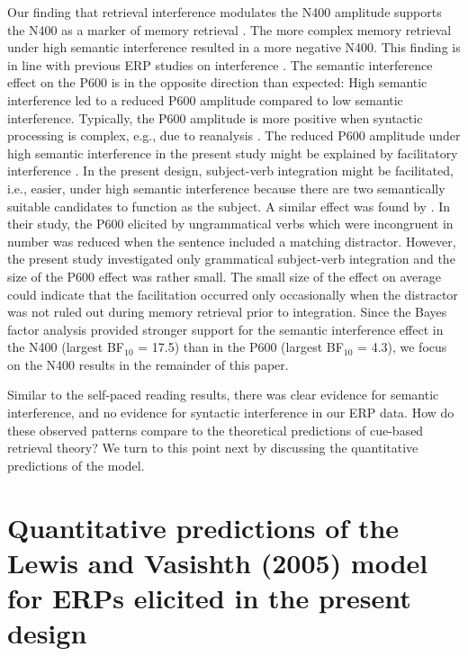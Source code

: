 \documentclass[review,preprint,12pt,authoryear,floatsintext]{elsarticle}
\begin{document}
Our finding that retrieval interference modulates the N400 amplitude supports the N400 as a marker of memory retrieval \citep{kutas&federmeier_2000, kutas_federmeier2011, brouwer2017_n4_p6, lau2008_n400}. The more complex memory retrieval under high semantic interference resulted in a more negative N400. This finding is in line with previous ERP studies on interference \citep{lee_garnsey, vasishth_drenhaus_2011, martinetal2014, schoknecht2022}. The semantic interference effect on the P600 is in the opposite direction than expected: High semantic interference led to a reduced P600 amplitude compared to low semantic interference. Typically, the P600 amplitude is more positive when syntactic processing is complex, e.g., due to reanalysis \citep{osterhout&holcomb_1992}. The reduced P600 amplitude under high semantic interference in the present study might be explained by facilitatory interference \citep[see e.g.,][]{jaeger_etal_2017}. In the present design, subject-verb integration might be facilitated, i.e., easier, under high semantic interference because there are two semantically suitable candidates to function as the subject. A similar effect was found by \cite{Tanner_etal_2017}. In their study, the P600 elicited by ungrammatical verbs which were incongruent in number was reduced when the sentence included a matching distractor. However, the present study investigated only grammatical subject-verb integration and the size of the P600 effect was rather small. The small size of the effect on average could indicate that the facilitation occurred only occasionally when the distractor was not ruled out during memory retrieval prior to integration. Since the Bayes factor analysis provided stronger support for the semantic interference effect in the N400 (largest BF$_{10}$ = 17.5) than in the P600 (largest BF$_{10}$ = 4.3), we focus on the N400 results in the remainder of this paper.

Similar to the self-paced reading results, there was clear evidence for semantic interference, and no evidence for syntactic interference in our ERP data. How do these observed patterns compare to the theoretical predictions of cue-based retrieval theory? We turn to this point next by discussing the quantitative predictions of the \cite{Lewis2005} model.

\section{Quantitative predictions of the Lewis and Vasishth (2005) model for ERPs elicited in the present design}
\end{document}
